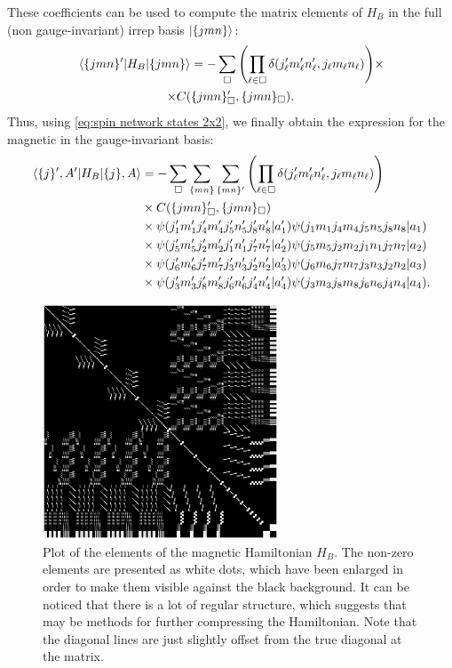 These coefficients can be used to compute the matrix elements of $H_B$ in the full (non gauge-invariant) \ac{irrep} basis $\ket{ \{jmn\} }$:
\begin{multline}
    \mel{ \{jmn\}^{\prime} }{H_B}{ \{jmn\} } =
    - \sum_{\square}
        \qty(
            \prod_{\ell \in \square} \delta( j_{\ell}^{\prime} m_{\ell}^{\prime} n_{\ell}^{\prime}, j_{\ell} m_{\ell} n_{\ell} )
        ) \times \\
        \times C( \{jmn\}_{\square}^{\prime}, \{jmn\}_{\square}).
\end{multline}
Thus, using \eqref{eq:spin network states 2x2}, we finally obtain the expression for the magnetic in the gauge-invariant basis:
\begin{equation}
    \begin{split}
        \mel{ \{j\}^{\prime}, A^{\prime}}{H_B}{ \{j\}, A} & =
        - \sum_{\square} \sum_{ \{mn\} } \sum_{ \{mn\}^{\prime} }
            \qty(
                \prod_{\ell \in \square} \delta( j_{\ell}^{\prime} m_{\ell}^{\prime} n_{\ell}^{\prime}, j_{\ell} m_{\ell} n_{\ell} )
            ) \\
            & \times C( \{jmn\}_{\square}^{\prime}, \{jmn\}_{\square}) \\
            & \times \psi ( j_{1}^\prime m_{1}^\prime j_{4}^\prime m_{4}^\prime j_{5}^\prime n_{5}^\prime j_{8}^\prime n_{8}^\prime | a_{1}^\prime ) \psi ( j_{1} m_{1} j_{4} m_{4} j_{5} n_{5} j_{8} n_{8} | a_{1} ) \\
            & \times \psi ( j_{5}^\prime m_{5}^\prime j_{2}^\prime m_{2}^\prime j_{1}^\prime n_{1}^\prime j_{7}^\prime n_{7}^\prime | a_{2}^\prime ) \psi ( j_{5} m_{5} j_{2} m_{2} j_{1} n_{1} j_{7} n_{7} | a_{2} ) \\
            & \times \psi ( j_{6}^\prime m_{6}^\prime j_{7}^\prime m_{7}^\prime j_{3}^\prime n_{3}^\prime j_{2}^\prime n_{2}^\prime | a_{3}^\prime ) \psi ( j_{6} m_{6} j_{7} m_{7} j_{3} n_{3} j_{2} n_{2} | a_{3} ) \\
            & \times \psi ( j_{3}^\prime m_{3}^\prime j_{8}^\prime m_{8}^\prime j_{6}^\prime n_{6}^\prime j_{4}^\prime n_{4}^\prime | a_{4}^\prime ) \psi ( j_{3} m_{3} j_{8} m_{8} j_{6} n_{6} j_{4} n_{4} | a_{4} ).
    \end{split}
    \label{eq:explicit_magn_Hamiltonian}
\end{equation}

\begin{figure}[t]
    \centering
    \includegraphics[width=7cm]{assets/graphs/magn_sparse.png}
    \caption[Non-zero elements of $H_B$]{%
        Plot of the elements of the magnetic Hamiltonian $H_B$.
        The non-zero elements are presented as white dots, which have been enlarged in order to make them visible against the black background.
        It can be noticed that there is a lot of regular structure, which suggests that may be methods for further compressing the Hamiltonian.
        Note that the diagonal lines are just slightly offset from the true diagonal at the matrix.
    }
    \label{fig:magn_sparse}
\end{figure}


